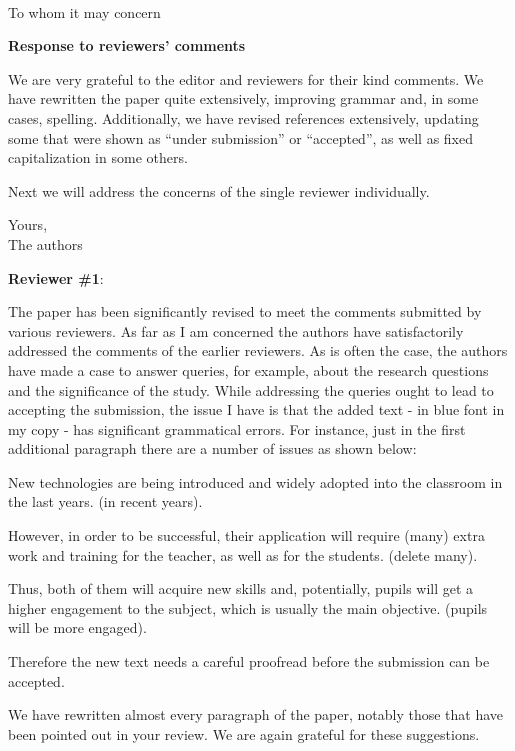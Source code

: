 \documentclass{letter}
\begin{document}
\vspace{0.5cm}

\vspace{0.5cm}
\ \
{
\begin{minipage}[t]{9cm}
To whom it may concern
\end{minipage}
}

\vspace{0.5cm}



{\bf Response to reviewers' comments}

We are very grateful to the editor and reviewers for their kind comments. We have rewritten
the paper quite extensively, improving grammar and, in some cases,
spelling. Additionally, we have revised references extensively, updating some
that were shown as ``under submission'' or ``accepted'', as well as fixed
capitalization in some others.

Next we will address the concerns of the single reviewer individually.


\hspace*{8cm} Yours,  \\


\hspace*{8cm} The authors


\newpage


{\it

  {\bf Reviewer \#1}:

The paper has been significantly revised to meet the comments submitted by various reviewers. As far as I am concerned the authors have satisfactorily addressed the comments of the earlier reviewers. As is often the case, the authors have made a case to answer queries, for example, about the research questions and the significance of the study.
While addressing the queries ought to lead to accepting the submission, the issue I have is that the added text - in blue font in my copy - has significant grammatical errors. For instance, just in the first additional paragraph there are a number of issues as shown below:

New technologies are being introduced and widely adopted into the classroom in the
last years. (in recent years).

However, in order to be successful, their application will require (many)
extra work and training for the teacher, as well as for the students. (delete many).

Thus, both of them will acquire new skills and, potentially, pupils will get a higher engagement to the subject, which is usually the main objective. (pupils will be more engaged).

Therefore the new text needs a careful proofread before the submission can be accepted.}


We have rewritten almost every paragraph of the paper, notably those that have
been pointed out in your review. We are again grateful for these suggestions.
\end{document}
